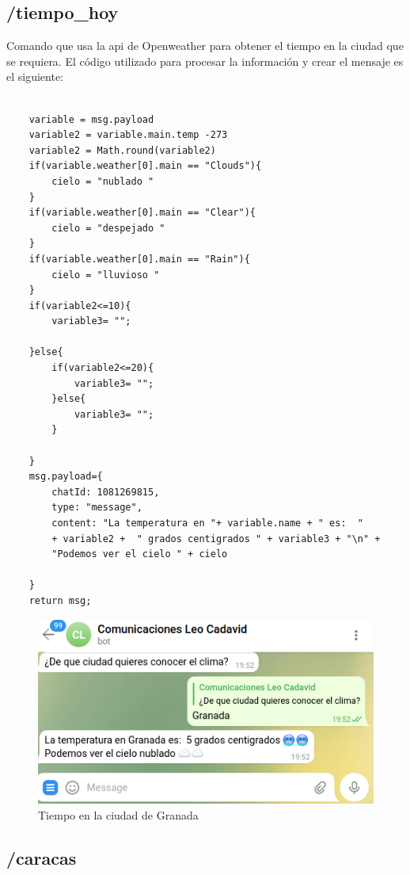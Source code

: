 \documentclass[12pt]{article}
\begin{document}
\subsection{/tiempo\_hoy}\label{ch:t_hoy}

Comando que usa la api de Openweather para obtener el tiempo en la ciudad que se requiera. 
El código utilizado para procesar la información y crear el mensaje es el siguiente:\\

\begin{verbatim}
    
    variable = msg.payload
    variable2 = variable.main.temp -273
    variable2 = Math.round(variable2)
    if(variable.weather[0].main == "Clouds"){
        cielo = "nublado "
    }
    if(variable.weather[0].main == "Clear"){
        cielo = "despejado "
    }
    if(variable.weather[0].main == "Rain"){
        cielo = "lluvioso "
    }
    if(variable2<=10){
        variable3= "";
        
    }else{
        if(variable2<=20){
            variable3= "";
        }else{
            variable3= "";
        }
        
    }
    msg.payload={
        chatId: 1081269815,
        type: "message",
        content: "La temperatura en "+ variable.name + " es:  " 
        + variable2 +  " grados centigrados " + variable3 + "\n" +
        "Podemos ver el cielo " + cielo
        
    }
    return msg;
\end{verbatim}


\begin{figure}[H]
    \centering
    \includegraphics[scale=0.4]{comandotiempo_hoy.png}
    \caption{Tiempo en la ciudad de Granada}
    \label{ebot_thoy}
\end{figure}

\subsection{/caracas}
\end{document}
